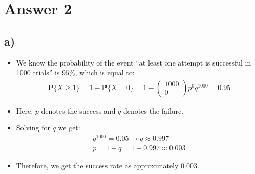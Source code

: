 \documentclass[12pt]{article}
\begin{document}
\section*{Answer 2}

\subsection*{a)} 
\begin{itemize}
 \item We know the probability of the event ``at least one attempt is successful in 1000 trials'' is $95\%$, which is equal to:
 \begin{equation*}
    \begin{split}
        \textbf{P}\{X \geq 1\} = 1 - \textbf{P}\{X = 0\} = 1 - \begin{pmatrix} 1000 \\ 0 \end{pmatrix}p^0q^{1000} = 0.95
    \end{split}
 \end{equation*}
 \item Here, $p$ denotes the success and $q$ denotes the failure.
 \item Solving for $q$ we get:
 \begin{equation*}
    \begin{split}
        q^{1000} = 0.05 \rightarrow q \approx 0.997\\
        p = 1 - q = 1 - 0.997 \approx 0.003
    \end{split}
 \end{equation*}
 \item Therefore, we get the success rate as approximately 0.003.
\end{itemize}
\end{document}
